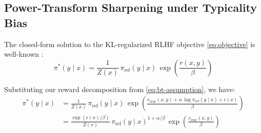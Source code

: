 


\subsection{Power-Transform Sharpening under Typicality Bias}
\label{app:power-sharpening}

The closed-form solution to the KL-regularized RLHF objective \eqref{eq:objective} is well-known \citep{rafailov2024directpreferenceoptimizationlanguage}:
\begin{equation}
\pi^*(y\mid x) = \frac{1}{Z(x)}\,\pi_{\mathrm{ref}}(y\mid x)\,\exp\!\left(\frac{r(x,y)}{\beta}\right)
\end{equation}

Substituting our reward decomposition from \eqref{eq:bt-assumption}, we have:
\begin{align}
\pi^*(y\mid x) &= \frac{1}{Z(x)}\,\pi_{\mathrm{ref}}(y\mid x)\,\exp\!\left(\frac{r_{\text{true}}(x,y) + \alpha\,\log \pi_{\mathrm{ref}}(y\mid x) + \epsilon(x)}{\beta}\right) \nonumber\\
&= \frac{\exp(\epsilon(x)/\beta)}{Z(x)}\,\pi_{\mathrm{ref}}(y\mid x)^{1+\alpha/\beta}\,\exp\!\left(\frac{r_{\text{true}}(x,y)}{\beta}\right)
\end{align}

